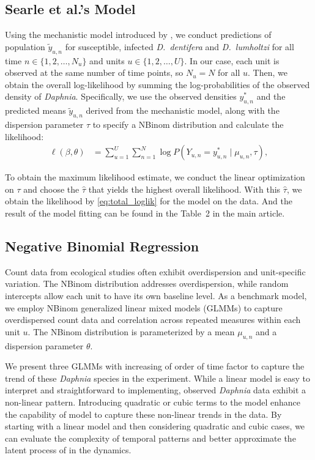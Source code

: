 \documentclass[aoas,preprint]{imsart}\usepackage[]{graphicx}\usepackage[]{xcolor}
\newcommand\Unit{U}
\newcommand\unit{u}
\newcommand\benchmarktime{n}
\begin{document}
\subsection{Searle et al.’s Model}

Using the mechanistic model introduced by \citet{searle16}, we conduct predictions of population $\tilde{y}_{\unit,\benchmarktime}$ for susceptible, infected \textit{D.~dentifera} and \textit{D.~lumholtzi} for all time $\benchmarktime \in \{1,2,\dots,N_{\unit}\}$ and units $\unit \in \{1,2,\dots,U\}$.
In our case, each unit is observed at the same number of time points, so $N_{\unit} = N$ for all $\unit$.
Then, we obtain the overall log-likelihood by summing the log-probabilities of the observed density of \textit{Daphnia}.
Specifically, we use the observed densities $y^*_{\unit,\benchmarktime}$ and the predicted means $\tilde{y}_{\unit,\benchmarktime}$ derived from the mechanistic model, along with the dispersion parameter $\tau$ to specify a NBinom distribution and calculate the likelihood:
\begin{align}
\ell(\beta, \theta) &= \sum_{\unit=1}^{\Unit}\sum_{\benchmarktime=1}^{N}
\log P(Y_{\unit,\benchmarktime} = y^*_{\unit,\benchmarktime} \mid \mu_{\unit,\benchmarktime}, \tau),
\label{eq:total_loglik}
\end{align}

To obtain the maximum likelihood estimate, we conduct the linear optimization on $\tau$ and choose the $\hat{\tau}$ that yields the highest overall likelihood. 
With this $\hat{\tau}$, we obtain the likelihood by \ref{eq:total_loglik} for the model on the data. And the result of the model fitting can be found in the Table~2 in the main article.

\subsection{Negative Binomial Regression}

Count data from ecological studies often exhibit overdispersion and unit-specific variation.
The NBinom distribution addresses overdispersion, while random intercepts allow each unit to have its own baseline level.
As a benchmark model, we employ NBinom generalized linear mixed models (GLMMs) to capture overdispersed count data and correlation across repeated measures within each unit $\unit$.
The NBinom distribution is parameterized by a mean $\mu_{\unit,\benchmarktime}$ and a dispersion parameter $\theta$.

We present three GLMMs with increasing of order of time factor to capture the trend of these \textit{Daphnia} species in the experiment.
While a linear model is easy to interpret and straightforward to implementing, observed \textit{Daphnia} data exhibit a non-linear pattern.
Introducing quadratic or cubic terms to the model enhance the capability of model to capture these non-linear trends in the data.
By starting with a linear model and then considering quadratic and cubic cases, we can evaluate the complexity of temporal patterns and better approximate the latent process of in the dynamics.
\end{document}
